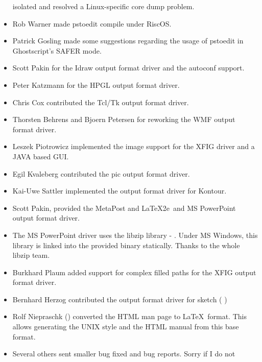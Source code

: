 \documentclass[english,a4paper]{article}
\begin{document}
\begin{itemize}
      isolated and resolved a
     Linux-specific core dump problem.
  \item Rob Warner  made pstoedit compile under RiscOS.
  \item Patrick Gosling  made some suggestions
     regarding the usage of pstoedit in Ghostscript's SAFER mode.
  \item Scott Pakin  for the Idraw output format driver and the
	autoconf support.
  \item Peter Katzmann  for the HPGL output format driver.
  \item Chris Cox  contributed the Tcl/Tk output format driver.
  \item Thorsten Behrens  and
     Bjoern Petersen for reworking the WMF output format driver.
  \item Leszek Piotrowicz  implemented the image
     support for the XFIG driver and a JAVA based GUI.
  \item Egil Kvaleberg  contributed the pic output format driver.
  \item Kai-Uwe Sattler  implemented the
     output format driver for Kontour.
  \item Scott Pakin,  provided the MetaPost and \LaTeX2e\ and MS PowerPoint output format driver.
  \item The MS PowerPoint driver uses the libzip library - . Under MS Windows, this library is linked into the provided binary statically. Thanks to the whole libzip team.
  \item Burkhard Plaum  added support for
     complex filled paths for the XFIG output format driver.
  \item Bernhard Herzog  contributed the output format driver for
     sketch (  )
  \item Rolf Niepraschk () converted the HTML man page
     to \LaTeX\  format. This allows generating the UNIX style and the HTML manual from this
     base format.
  \item Several others sent smaller bug fixed and bug reports. Sorry if I do not

\end{itemize}
\end{document}
